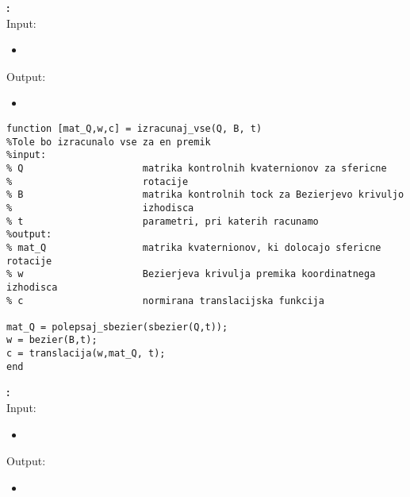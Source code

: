 \documentclass[12pt,a4paper,twoside]{article}
\theoremstyle{definition} %
\theoremstyle{plain} %
\numberwithin{equation}{section}  %
\begin{document}
\textbf{:}\\
Input:
\begin{itemize}
\item 
\end{itemize}
Output:
\begin{itemize}
\item 
\end{itemize}

\begin{lstlisting}[caption = {\color{green} izracunaj\_vse}]
function [mat_Q,w,c] = izracunaj_vse(Q, B, t)
%Tole bo izracunalo vse za en premik
%input:
% Q                     matrika kontrolnih kvaternionov za sfericne
%                       rotacije
% B                     matrika kontrolnih tock za Bezierjevo krivuljo
%                       izhodisca
% t                     parametri, pri katerih racunamo
%output:
% mat_Q                 matrika kvaternionov, ki dolocajo sfericne rotacije
% w                     Bezierjeva krivulja premika koordinatnega izhodisca
% c                     normirana translacijska funkcija

mat_Q = polepsaj_sbezier(sbezier(Q,t));
w = bezier(B,t);
c = translacija(w,mat_Q, t);
end
\end{lstlisting}

\textbf{:}\\
Input:
\begin{itemize}
\item 
\end{itemize}
Output:
\begin{itemize}
\item 
\end{itemize}
\end{document}
